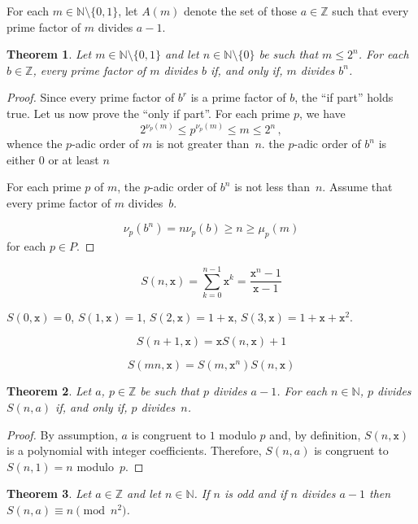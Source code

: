 \documentclass[12pt]{article}
\newcommand{\bZ}{\mathbb{Z}}
\newcommand{\ttx}{\mathtt{x}}
\newcommand{\bN}{\mathbb{N}} %
\newcommand{\bNast}{\bN \setminus \{ 0 \}}
\newcommand{\bNdeux}{\bN \setminus \{ 0, 1 \}}
\newtheorem{theorem}{Theorem}
\theoremstyle{definition}
\begin{document}
 For each $m \in \bNdeux$,
 let $A(m)$ denote the set of those $a \in \bZ$ such that every prime factor of $m$ divides $a - 1$.

 \begin{theorem}
   Let $m \in \bNdeux$ and let $n \in \bNast$ be such that $m \le 2^n$.
   For each $b \in \bZ$, 
   every prime factor of $m$ divides $b$ if, and only if, $m$ divides $b^n$.
   \end{theorem}

   \begin{proof}
     Since every prime factor of $b^r$ is a prime factor of $b$, the ``if part'' holds true.
     Let us now prove the ``only if part''.
     For each prime $p$,
     we have 
     $$
     2^{\nu_p(m)} \le p^{\nu_p(m)} \le m \le 2^n \,, 
     $$
     whence the $p$-adic order of $m$ is not greater than~$n$.
          the $p$-adic order of $b^n$ is either $0$ or at least $n$

     For each prime  $p$ of $m$,
     the $p$-adic order of $b^n$ is not less than~$n$.
     Assume that every prime factor of $m$ divides~$b$.
    
     $$\nu_p(b^n) = n \nu_p(b) \ge n \ge \mu_p(m)
     $$ for each $p \in P$.
   \end{proof}

   $$
   S(n, \ttx) = \sum_{k = 0}^{n - 1} \ttx^k  = \frac{\ttx^n - 1}{\ttx - 1} 
   $$
   

   $S(0, \ttx) = 0$, $S(1, \ttx) = 1$, $S(2, \ttx) = 1 + \ttx$, $S(3, \ttx) = 1 + \ttx + \ttx^2$.

   $$
   S(n + 1, \ttx) = \ttx S(n, \ttx) + 1
   $$

   $$
   S(mn, \ttx) = S(m, \ttx^n) S(n, \ttx)
   $$

   \begin{theorem} \label{th:div-a-div-S-div-n}
   Let $a$, $p \in \bZ$ be such that $p$ divides $a - 1$.
   For each $n \in \bN$, $p$ divides $S(n, a)$ if, and only if, $p$ divides~$n$.
 \end{theorem}

 \begin{proof}
   By assumption, $a$ is congruent to $1$ modulo $p$ and,  
   by definition, $S(n, \ttx)$ is a polynomial with integer coefficients.
   Therefore, $S(n, a)$ is congruent to $S(n, 1) = n$ modulo~$p$.
 \end{proof}
   
 
   \begin{theorem} \label{thm:n-odd-ncarre}
   Let $a \in \bZ$ and let $n \in \bN$.
   If $n$ is odd and if $n$ divides $a  - 1$ then $S(n, a) \equiv n \pmod {n^2}$.
   \end{theorem}
\end{document}
